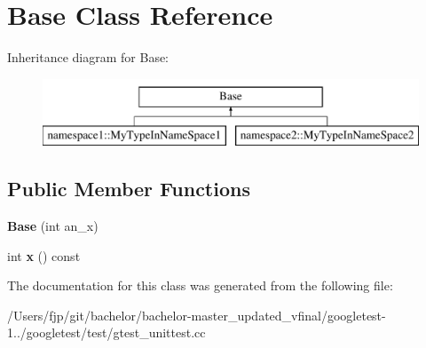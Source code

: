 \hypertarget{class_base}{}\section{Base Class Reference}
\label{class_base}
Inheritance diagram for Base\+:\begin{figure}[H]
\begin{center}
\leavevmode
\includegraphics[height=2.000000cm]{class_base}
\end{center}
\end{figure}
\subsection*{Public Member Functions}
\begin{DoxyCompactItemize}
\item 
\mbox{\label{class_base_a1d5f3fb92f8cbc687705785bdc6abd18}} 
{\bfseries Base} (int an\+\_\+x)
\item 
\mbox{\label{class_base_a779fd2b157ebd763b15383d96047e07c}} 
int {\bfseries x} () const
\end{DoxyCompactItemize}


The documentation for this class was generated from the following file\+:\begin{DoxyCompactItemize}
\item 
/\+Users/fjp/git/bachelor/bachelor-\/master\+\_\+updated\+\_\+vfinal/googletest-\/1../googletest/test/gtest\+\_\+unittest.\+cc\end{DoxyCompactItemize}

